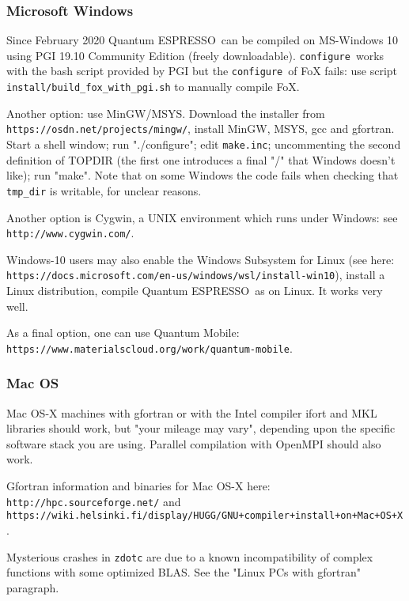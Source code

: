 \documentclass[12pt,a4paper]{article}
\def\qe{{\sc Quantum ESPRESSO}}
\def\configure{\texttt{configure}}
\begin{document}
\subsubsection{Microsoft Windows}
\label{SubSec:Windows}
Since February 2020 \qe\ can be compiled on MS-Windows 10 using PGI 19.10 
Community Edition (freely downloadable). \configure\ works with the bash
script provided by PGI but the \configure\ of FoX fails: use script 
\texttt{install/build\_fox\_with\_pgi.sh} to manually compile FoX.

Another option: use MinGW/MSYS. Download the installer from
\texttt{https://osdn.net/projects/mingw/}, install MinGW, MSYS, gcc and
gfortran. Start a shell window; run "./configure"; edit \texttt{make.inc}; 
uncommenting the second definition of TOPDIR (the first one introduces a 
final "/" that Windows doesn't like); run "make". Note that on some Windows 
the code fails when checking that \texttt{tmp\_dir} is writable, for unclear 
reasons.

Another option is Cygwin, a UNIX environment which runs under Windows: see\\
\texttt{http://www.cygwin.com/}. 

Windows-10 users may also enable the Windows Subsystem for Linux (see here:\\
\texttt{https://docs.microsoft.com/en-us/windows/wsl/install-win10}),
install a Linux distribution, compile \qe\ as on Linux. It works very well.

As a final option, one can use Quantum Mobile:\\
\texttt{https://www.materialscloud.org/work/quantum-mobile}.

\subsubsection{Mac OS}

Mac OS-X machines with gfortran or with the Intel compiler ifort
and MKL libraries should work, but "your mileage may vary", depending
upon the specific software stack you are using. Parallel compilation 
with OpenMPI should also work. 

Gfortran information and binaries for Mac OS-X here:
\texttt{http://hpc.sourceforge.net/} and
\texttt{https://wiki.helsinki.fi/display/HUGG/GNU+compiler+install+on+Mac+OS+X}.

Mysterious crashes in \texttt{zdotc} are due to a known incompatibility of 
complex functions with some optimized BLAS. See the "Linux PCs with gfortran" 
paragraph.
\end{document}
